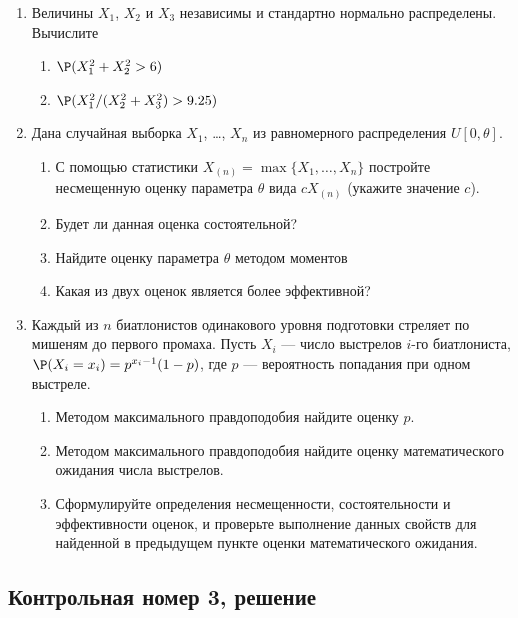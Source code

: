 \begin{enumerate}
\item Величины $X_1$, $X_2$ и $X_3$  независимы и стандартно нормально распределены. Вычислите
\begin{enumerate}
\item $\P(X_1^2 + X_2^2 > 6)$
\item $\P(X_1^2 / (X_2^2 + X_3^2) > 9.25 )$
\end{enumerate}

\item Дана случайная выборка $X_1$, \ldots, $X_n$ из равномерного распределения $U[0, \theta]$.
\begin{enumerate}
\item С помощью статистики $X_{(n)}=\max\{X_1, \ldots, X_n \}$ постройте несмещенную оценку параметра $\theta$  вида $cX_{(n)}$ (укажите значение $c$).
\item Будет ли данная оценка состоятельной?
\item Найдите оценку параметра $\theta$ методом моментов
\item Какая из двух оценок является более эффективной?
\end{enumerate}

\item Каждый из $n$ биатлонистов одинакового уровня подготовки стреляет по мишеням до первого промаха.  Пусть $X_i$ — число выстрелов $i$-го биатлониста, $\P(X_i = x_i)=p^{x_i-1}(1-p)$, где $p$ — вероятность попадания при одном выстреле.
\begin{enumerate}
\item Методом максимального правдоподобия найдите оценку $p$.
\item Методом максимального правдоподобия найдите оценку математического ожидания числа выстрелов.
\item Сформулируйте определения несмещенности, состоятельности и эффективности  оценок, и проверьте выполнение данных свойств для найденной в предыдущем пункте оценки математического ожидания.
\end{enumerate}


\end{enumerate}


\subsection{Контрольная номер 3, решение}

